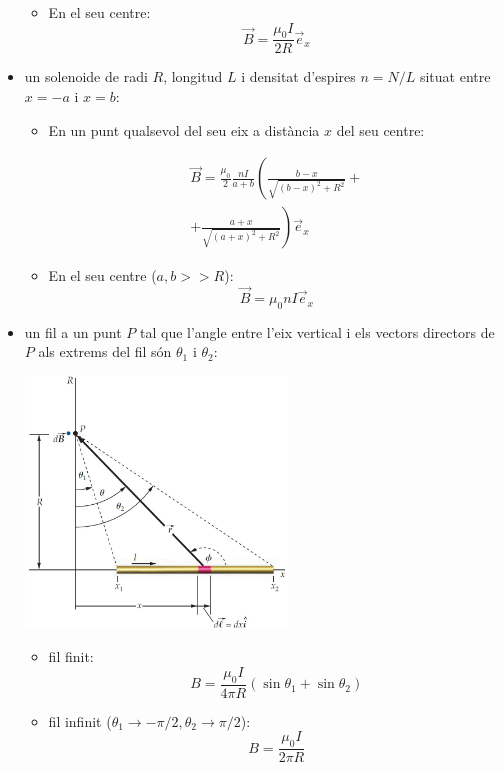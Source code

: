 \documentclass[class=article,10pt,crop=false]{standalone}
\begin{document}
\begin{multicols}{2}
\begin{itemize}
\begin{itemize}
        \item En el seu centre: $$\Vec{B}=\frac{\mu_0I}{2R}\Vec{e}_x$$
    \end{itemize}
    \item un solenoide de radi $R$, longitud $L$ i densitat d'espires $n=N/L$ situat entre $x=-a$ i $x=b$:
    \begin{itemize}
        \item En un punt qualsevol del seu eix a distància $x$ del seu centre:
        \begin{footnotesize}
            \begin{multline*} \Vec{B}=\frac{\mu_0}{2}\frac{nI}{a+b}\left(\frac{b-x}{\sqrt{(b-x)^2+R^2}}+\right.\\\left.+\frac{a+x}{\sqrt{(a+x)^2+R^2}}\right)\Vec{e}_x
            \end{multline*}
        \end{footnotesize}
        \item En el seu centre ($a,b>>R$): $$\Vec{B}=\mu_0 nI\Vec{e}_x$$
    \end{itemize}
    \item un fil a un punt $P$ tal que l'angle entre l'eix vertical i els vectors directors de $P$ als extrems del fil són $\theta_1$ i $\theta_2$:\newline
    \begin{minipage}{\linewidth}
        \centering
        \includegraphics[width=7cm]{Physics/1st/Electricity_and_magnetism/Images/fil.jpg} 
    \end{minipage}
    \begin{itemize}
        \item fil finit: $$B=\frac{\mu_0I}{4\pi R}(\sin\theta_1+\sin\theta_2)$$
        \item fil infinit ($\theta_1\to-\pi/2,\theta_2\to\pi/2$): $$B=\frac{\mu_0I}{2\pi R}$$
    \end{itemize}

\end{itemize}
\end{multicols}
\end{document}
